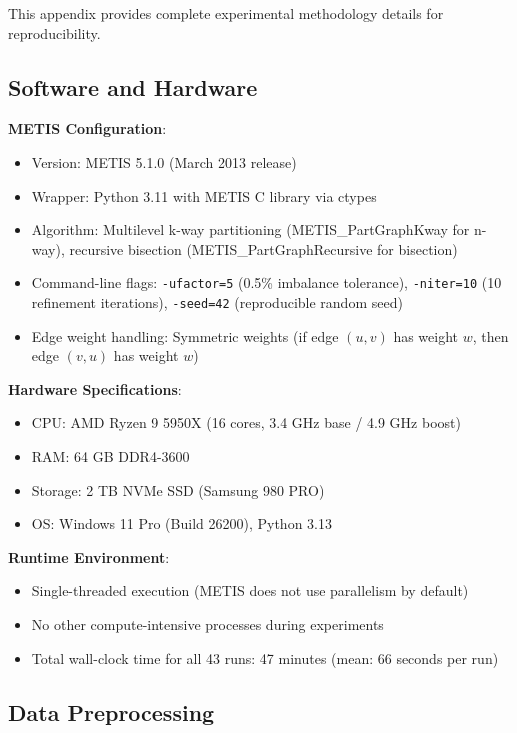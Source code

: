
This appendix provides complete experimental methodology details for reproducibility.

\subsection{Software and Hardware}

\textbf{METIS Configuration}:
\begin{itemize}
    \item Version: METIS 5.1.0 (March 2013 release)
    \item Wrapper: Python 3.11 with METIS C library via ctypes
    \item Algorithm: Multilevel k-way partitioning (METIS\_PartGraphKway for n-way), recursive bisection (METIS\_PartGraphRecursive for bisection)
    \item Command-line flags: \texttt{-ufactor=5} (0.5\% imbalance tolerance), \texttt{-niter=10} (10 refinement iterations), \texttt{-seed=42} (reproducible random seed)
    \item Edge weight handling: Symmetric weights (if edge $(u,v)$ has weight $w$, then edge $(v,u)$ has weight $w$)
\end{itemize}

\textbf{Hardware Specifications}:
\begin{itemize}
    \item CPU: AMD Ryzen 9 5950X (16 cores, 3.4 GHz base / 4.9 GHz boost)
    \item RAM: 64 GB DDR4-3600
    \item Storage: 2 TB NVMe SSD (Samsung 980 PRO)
    \item OS: Windows 11 Pro (Build 26200), Python 3.13
\end{itemize}

\textbf{Runtime Environment}:
\begin{itemize}
    \item Single-threaded execution (METIS does not use parallelism by default)
    \item No other compute-intensive processes during experiments
    \item Total wall-clock time for all 43 runs: 47 minutes (mean: 66 seconds per run)
\end{itemize}

\subsection{Data Preprocessing}

